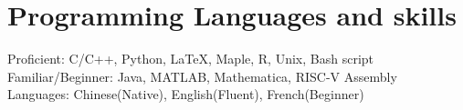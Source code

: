 \section{\sc Programming Languages and skills}
Proficient: C/C++, Python, \LaTeX, Maple, R, Unix, Bash script\\
Familiar/Beginner: Java, MATLAB, Mathematica, RISC-V Assembly\\
Languages: Chinese(Native), English(Fluent), French(Beginner)
\endinput